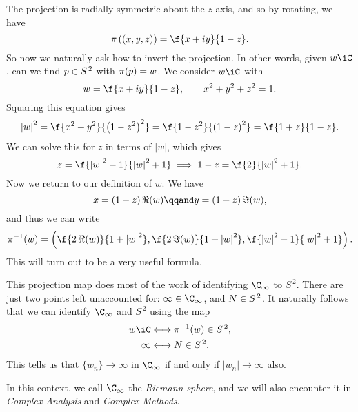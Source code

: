The projection is radially symmetric about the $z$-axis, and so by rotating, we have
\begin{equation*}
	\pi\left( (x,y,z) \right) = \f{x+iy}{1-z}.
\end{equation*}
So now we naturally ask how to invert the projection. In other words, given $w\iC$, can we find $p\in S^{\,2}$ with $\pi(p) = w$. We consider $w\iC$ with
\begin{equation*}
	w = \f{x+iy}{1-z}, \qquad x^2+y^2+z^2=1.
\end{equation*}
Squaring this equation gives
\begin{equation*}
	\left\vert w \right\vert^2
	= \f{x^2+y^2}{\left( 1-z^2 \right)^2}
	= \f{1-z^2}{\left( 1-z \right)^2}
	= \f{1+z}{1-z}.
\end{equation*}
We can solve this for $z$ in terms of $\left\vert w \right\vert$, which gives
\begin{equation*}
	z = \f{\left\vert w \right\vert^2-1}{\left\vert w \right\vert^2+1}
	\implies 1-z = \f{2}{\left\vert w \right\vert^2+1}.
\end{equation*}
Now we return to our definition of $w$. We have
\begin{equation*}
	x = \left( 1-z \right) \Re(w)
	\qqand
	y = \left( 1-z \right) \Im(w),
\end{equation*}
and thus we can write
\begin{equation*}
	\pi^{-1}(w) = \left( \f{2\,\Re(w)}{1+\left\vert w \right\vert^2}, \f{2\,\Im(w)}{1+\left\vert w \right\vert^2}, \f{\left\vert w \right\vert^2-1}{\left\vert w \right\vert^2+1} \right).
\end{equation*}
This will turn out to be a very useful formula.

This projection map does most of the work of identifying $\C_\infty$ to $S^{\,2}$. There are just two points left unaccounted for: $\infty\in\C_\infty$, and $N\in S^{\,2}$. It naturally follows that we can identify $\C_\infty$ and $S^{\,2}$ using the map
\begin{align*}
	w\iC & \longleftrightarrow \pi^{-1}(w) \in S^{\,2}, \\
	\infty & \longleftrightarrow \NN \in S^{\,2}.
\end{align*}
This tells us that $\{w_n\} \to \infty$ in $\C_\infty$ if and only if $\left\vert w_n \right\vert \to \infty$ also.

In this context, we call $\C_\infty$ the \emph{Riemann sphere}, and we will also encounter it in \emph{Complex Analysis} and \emph{Complex Methods}.

